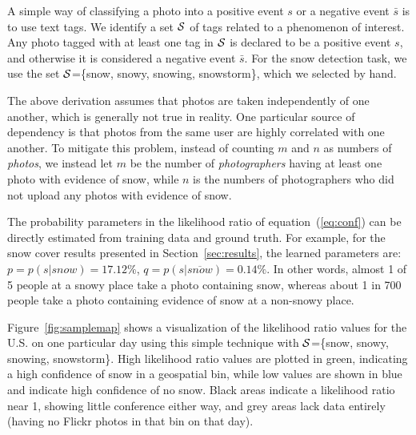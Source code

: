 \documentclass[10pt,journal,compsoc]{IEEEtran}
\begin{document}
A simple way of classifying a photo into a positive event $s$ or a
negative event $\bar{s}$ is to use text tags. We identify a
set ${\cal S}$ of tags related to a phenomenon of
interest. Any photo tagged with at least one tag in ${\cal S}$ is
declared to be a positive event $s$, and otherwise it is considered a
negative event $\bar{s}$. For the snow detection task, we use the set
${\cal S}$=\{snow, snowy, snowing, snowstorm\}, which we selected
by hand.


The above derivation assumes that photos are taken independently of
one another, which is generally not true in reality. One particular
source of dependency is that photos from the same user are highly
correlated with one another.  To mitigate this problem, instead of
counting $m$ and $n$ as numbers of \textit{photos}, we instead let $m$ be 
the number of \textit{photographers} having at least one photo with evidence of snow,
while $n$ is the numbers of photographers who did not upload any
photos with evidence of snow.

The probability parameters in the likelihood ratio of
equation~(\ref{eq:conf}) can be directly estimated from training data
and ground truth. For example, for the snow cover results
presented in Section~\ref{sec:results}, the learned parameters are: $p
= p(s|snow) = 17.12\%$, $q = p(s|\overline{snow}) = 0.14\%$.  In other
words, almost 1 of 5 people at a snowy place take a photo containing
snow, whereas about 1 in 700 people take a photo containing evidence
of snow at a non-snowy place.

Figure~\ref{fig:samplemap} shows a visualization of the likelihood
ratio values for the U.S. on one particular day using this simple
technique with ${\cal S}$=\{snow, snowy, snowing, snowstorm\}.  High
likelihood ratio values are plotted
in green, indicating a high confidence of snow in a geospatial bin,
while low values are shown in blue and indicate high confidence of 
no snow.  Black areas indicate a likelihood ratio 
near 1, showing little conference either way, and grey areas lack
data entirely (having no Flickr photos in that bin on that day).



\end{document}
